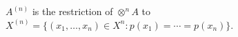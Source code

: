 
$A^{(n)}$ is the restriction of $\otimes^n A$ to $X^{(n)} = \{(x_1, \ldots, x_n) \in X^n : p(x_1) = \cdots = p(x_n)\}$.
